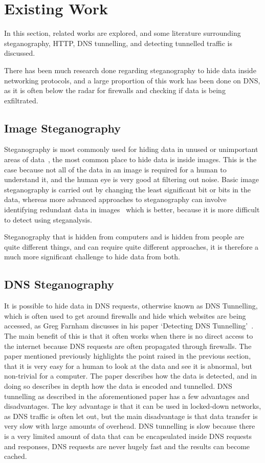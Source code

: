 \section{Existing Work}
In this section, related works are explored, and some literature surrounding steganography, HTTP, DNS tunnelling, and detecting tunnelled traffic is discussed.

There has been much research done regarding steganography to hide data inside networking protocols, and a large proportion of this work has been done on DNS, as it is often below the radar for firewalls and checking if data is being exfiltrated.
\subsection{Image Steganography}
Steganography is most commonly used for hiding data in unused or unimportant areas of data~\cite{exploringsteno}, the most common place to hide data is inside images. This is the case because not all of the data in an image is required for a human to understand it, and the human eye is very good at filtering out noise.
Basic image steganography is carried out by changing the least significant bit or bits in the data, whereas more advanced approaches to steganography can involve identifying redundant data in images~\cite{introsteno} which is better, because it is more difficult to detect using steganalysis.

Steganography that is hidden from computers and is hidden from people are quite different things, and can require quite different approaches, it is therefore a much more significant challenge to hide data from both.

\subsection{DNS Steganography}
It is possible to hide data in DNS requests, otherwise known as DNS Tunnelling, which is often used to get around firewalls and hide which websites are being accessed, as Greg Farnham discusses in his paper `Detecting DNS Tunnelling'~\cite{detectingdns}. The main benefit of this is that it often works when there is no direct access to the internet because DNS requests are often propagated through firewalls.
The paper mentioned previously highlights the point raised in the previous section, that it is very easy for a human to look at the data and see it is abnormal, but non-trivial for a computer.
The paper describes how the data is detected, and in doing so describes in depth how the data is encoded and tunnelled.
DNS tunnelling as described in the aforementioned paper has a few advantages and disadvantages.
The key advantage is that it can be used in locked-down networks, as DNS traffic is often let out, but the main disadvantage is that data transfer is very slow with large amounts of overhead.
DNS tunnelling is slow because there is a very limited amount of data that can be encapsulated inside DNS requests and responses, DNS requests are never hugely fast and the results can become cached.
